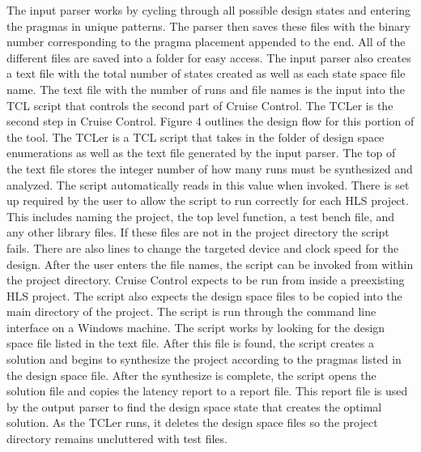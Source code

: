 \documentclass[letterpaper, 10 pt, conference]{IEEEconf}  %
\begin{document}
The input parser works by cycling through all possible design states and entering the pragmas in unique patterns. The parser then saves these files with the binary number corresponding to the pragma placement appended to the end. All of the different files are saved into a folder for easy access. The input parser also creates a text file with the total number of states created as well as each state space file name. The text file with the number of runs and file names is the input into the TCL script that controls the second part of Cruise Control.  \newline
\indent The TCLer is the second step in Cruise Control. Figure 4 outlines the design flow for this portion of the tool. The TCLer is a TCL script that takes in the folder of design space enumerations as well as the text file generated by the input parser. The top of the text file stores the integer number of how many runs must be synthesized and analyzed. The script automatically reads in this value when invoked. There is set up required by the user to allow the script to run correctly for each HLS project. This includes naming the project, the top level function, a test bench file, and any other library files. If these files are not in the project directory the script fails. There are also lines to change the targeted device and clock speed for the design. After the user enters the file names, the script can be invoked from within the project directory. Cruise Control expects to be run from inside a preexisting HLS project.  The script also expects the design space files to be copied into the main directory of the project. \newline
\indent The script is run through the command line interface on a Windows machine. The script works by looking for the design space file listed in the text file. After this file is found, the script creates a solution and begins to synthesize the project according to the pragmas listed in the design space file. After the synthesize is complete, the script opens the solution file and copies the latency report to a report file. This report file is used by the output parser to find the design space state that creates the optimal solution. As the TCLer runs, it deletes the design space files so the project directory remains uncluttered with test files. 
\end{document}
